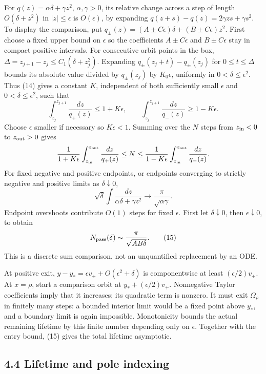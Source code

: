 \documentclass[11pt,letterpaper]{article}
\begin{document}
For \(q(z)=\alpha\delta+\gamma z^2\), \(\alpha,\gamma>0\), its relative
change across a step of length \(O(\delta+z^2)\) in \(|z|\le\epsilon\)
is \(O(\epsilon)\), by expanding \(q(z+s)-q(z)=2\gamma zs+\gamma s^2\).
To display the comparison, put
\(q_\pm(z)=(A\pm C\epsilon)\delta+(B\pm C\epsilon)z^2\). First choose a
fixed upper bound on \(\epsilon\) so the coefficients \(A\pm C\epsilon\)
and \(B\pm C\epsilon\) stay in compact positive intervals. For
consecutive orbit points in the box,
\(\Delta=z_{j+1}-z_j\le C_1(\delta+z_j^2)\). Expanding
\(q_\pm(z_j+t)-q_\pm(z_j)\) for \(0\le t\le\Delta\) bounds its absolute
value divided by \(q_\pm(z_j)\) by \(K_0\epsilon\), uniformly in
\(0<\delta\le\epsilon^2\). Thus (14) gives a constant \(K\), independent
of both sufficiently small \(\epsilon\) and \(0<\delta\le\epsilon^2\),
such that \[
 \int_{z_j}^{z_{j+1}}\frac{dz}{q_+(z)}\le1+K\epsilon,
 \qquad
 \int_{z_j}^{z_{j+1}}\frac{dz}{q_-(z)}\ge1-K\epsilon.
\] Choose \(\epsilon\) smaller if necessary so \(K\epsilon<1\). Summing
over the \(N\) steps from \(z_{\rm in}<0\) to \(z_{\rm out}>0\) gives \[
 \frac1{1+K\epsilon}\int_{z_{\rm in}}^{z_{\rm out}}\frac{dz}{q_+(z)}
 \le N\le
 \frac1{1-K\epsilon}\int_{z_{\rm in}}^{z_{\rm out}}\frac{dz}{q_-(z)}.
\] For fixed negative and positive endpoints, or endpoints converging to
strictly negative and positive limits as \(\delta\downarrow0\),
\[\sqrt\delta\int\frac{dz}{\alpha\delta+\gamma z^2}\longrightarrow\frac\pi{\sqrt{\alpha\gamma}}.\]
Endpoint overshoots contribute \(O(1)\) steps for fixed \(\epsilon\).
First let \(\delta\downarrow0\), then \(\epsilon\downarrow0\), to obtain
\[N_{\rm pass}(\delta)\sim\frac\pi{\sqrt{AB\delta}}.            \tag{15}\]
This is a discrete sum comparison, not an unquantified replacement by an
ODE.

At positive exit, \(y-y_*=\epsilon v_++O(\epsilon^2+\delta)\) is
componentwise at least \((\epsilon/2)v_+\). At \(x=\rho\), start a
comparison orbit at \(y_*+(\epsilon/2)v_+\). Nonnegative Taylor
coefficients imply that it increases; its quadratic term is nonzero. It
must exit \(\Omega_\rho\) in finitely many steps: a bounded interior
limit would be a fixed point above \(y_*\), and a boundary limit is
again impossible. Monotonicity bounds the actual remaining lifetime by
this finite number depending only on \(\epsilon\). Together with the
entry bound, (15) gives the total lifetime asymptotic.

\subsection{4.4 Lifetime and pole
indexing}\label{lifetime-and-pole-indexing}
\end{document}
